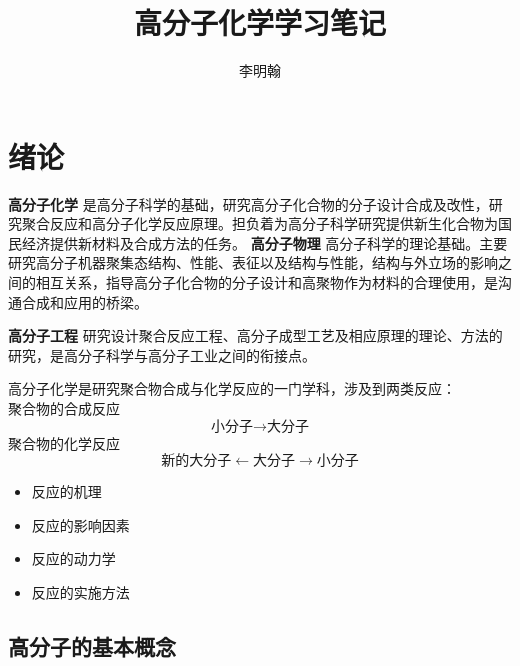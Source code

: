 ﻿\documentclass[12pt,a4paper]{article}
\title{高分子化学学习笔记}
\author{李明翰}
\begin{document}
\maketitle
\newpage
\tableofcontents
\newpage
\section{绪论}
{\bf{高分子化学}}  是高分子科学的基础，研究高分子化合物的分子设计合成及改性，研究聚合反应和高分子化学反应原理。担负着为高分子科学研究提供新生化合物为国民经济提供新材料及合成方法的任务。
{\bf{高分子物理}}  高分子科学的理论基础。主要研究高分子机器聚集态结构、性能、表征以及结构与性能，结构与外立场的影响之间的相互关系，指导高分子化合物的分子设计和高聚物作为材料的合理使用，是沟通合成和应用的桥梁。

{\bf{高分子工程}}  研究设计聚合反应工程、高分子成型工艺及相应原理的理论、方法的研究，是高分子科学与高分子工业之间的衔接点。
\begin{figure}[htbp]
\centering
{}
\end{figure}

高分子化学是研究聚合物合成与化学反应的一门学科，涉及到两类反应：\\
聚合物的合成反应
$${\text{小分子}\rightarrow\text{大分子}}$$
聚合物的化学反应
$$\text{新的大分子}\leftarrow\text{大分子}\rightarrow\text{小分子}$$
\begin{itemize}
\item 反应的机理
\item 反应的影响因素
\item 反应的动力学
\item 反应的实施方法
\end{itemize}
\subsection{高分子的基本概念}
\end{document}
